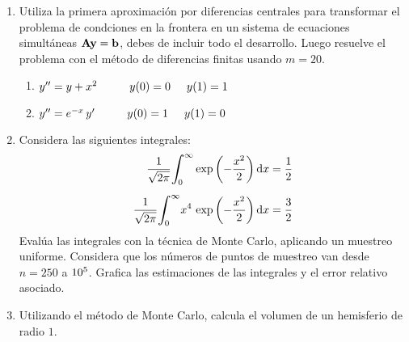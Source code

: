 \begin{enumerate}
\begin{enumerate}
\end{enumerate}
\item Utiliza la primera aproximación por diferencias centrales para transformar el problema de condciones en la frontera en un sistema de ecuaciones simultáneas $\vb{A y} = \vb{b}$, debes de incluir todo el desarrollo. Luego resuelve el problema con el método de diferencias finitas  usando $m = 20$.
\begin{enumerate}
\item ${y}^{\prime \prime} = y + x^{2} \hspace{1cm} y (0) = 0 \hspace{0.5cm} y (1) = 1$
\item ${y}^{\prime \prime} = e^{-x} \, {y}^{\prime} \hspace{1cm} y (0) = 1 \hspace{0.5cm} y (1) = 0$
\end{enumerate}
\item Considera las siguientes integrales:
\begin{align*}
\dfrac{1}{\sqrt{2 \pi}} \scaleint{6ex}_{\bs 0}^{\infty} \exp\left( -\dfrac{x^{2}}{2}\right) \dd{x} &= \dfrac{1}{2} \\[0.5em]
\dfrac{1}{\sqrt{2 \pi}} \scaleint{6ex}_{\bs 0}^{\infty} x^{4} \, \exp\left( -\dfrac{x^{2}}{2}\right) \dd{x} &= \dfrac{3}{2}
\end{align*}
Evalúa las integrales con la técnica de Monte Carlo, aplicando un muestreo uniforme. Considera que  los números de puntos de muestreo van desde $n = 250$ a $\num{d5}$. Grafica las estimaciones de las integrales y el error relativo asociado.
\item Utilizando el método de Monte Carlo, calcula el volumen de un hemisferio de radio $1$.
\end{enumerate}

